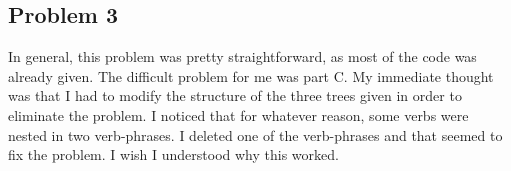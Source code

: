 \documentclass[11pt]{article}
\begin{document}
\subsection{Problem 3}
\label{sec:orgheadline3}

In general, this problem was pretty straightforward, as most of the code was already given. The difficult problem for me was part C. My immediate thought was that I had to modify the structure of the three trees given in order to eliminate the problem. I noticed that for whatever reason, some verbs were nested in two verb-phrases. I deleted one of the verb-phrases and that seemed to fix the problem. I wish I understood why this worked. 
\end{document}
